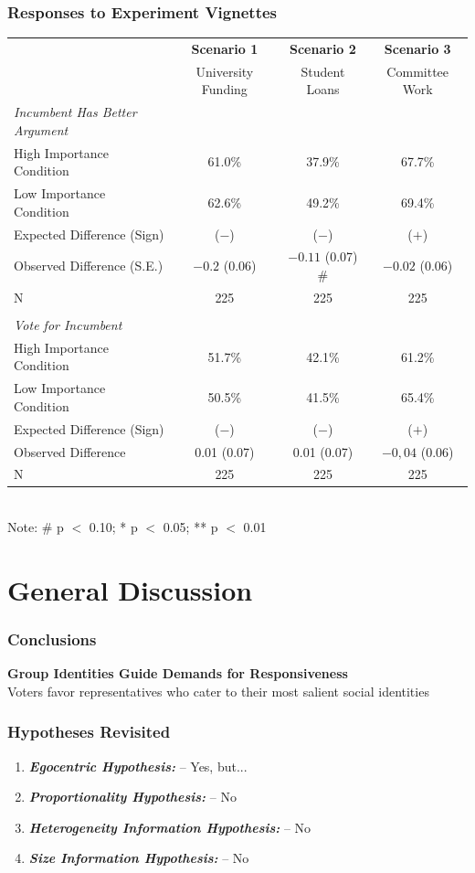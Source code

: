 \documentclass[14pt]{beamer}
\newcommand\e{\emph}
\newcommand\tb{\textbf}
\begin{document}
\begin{frame}
\frametitle{Responses to Experiment Vignettes}
\scriptsize
\begin{table}
	\centering
	\begin{tabulary}{\linewidth}{Lccc}
	\\
	\hline
	&\tb{Scenario 1}&\tb{Scenario 2}&\tb{Scenario 3}\\
	&University Funding& Student Loans&Committee Work\\
	\hline
	\e{Incumbent Has Better Argument}&&&\\
	High Importance Condition&61.0\%&37.9\%&67.7\% \\
	Low Importance Condition&62.6\%&49.2\%&69.4\%\\
	Expected Difference (Sign)& ($-$)&($-$)&($+$)\\
	Observed Difference (S.E.)&$-0.2$ (0.06)&$-0.11$ (0.07) \# &$-0.02$ (0.06)\\
	N&225&225&225\\
	&&&\\
	\e{Vote for Incumbent}&&&\\
	High Importance Condition&51.7\%&42.1\%&61.2\%\\
	Low Importance Condition&50.5\%&41.5\%&65.4\%\\
	Expected Difference (Sign)& ($-$)&($-$)&($+$)\\
	Observed Difference&0.01 (0.07)&0.01 (0.07)&$-0,04$ (0.06)\\
	N&225&225&225\\
	\hline
	\end{tabulary}\\
Note: \# p $<$ 0.10; * p $<$ 0.05; ** p $<$ 0.01
\end{table}
\end{frame}

\section{General Discussion}
\begin{frame}
\frametitle{Conclusions}
\begin{center}
	\large
	\tb{Group Identities Guide Demands for Responsiveness} \\
	\smallskip
	\normalsize 
	Voters favor representatives who cater to their most salient social identities
\end{center}
\end{frame}

\begin{frame}
\frametitle{Hypotheses Revisited}
\begin{enumerate}
	\item \tb{\e{Egocentric Hypothesis:}} -- Yes, but...
	\item \tb{\e{Proportionality Hypothesis:}} -- No
	\item \tb{\e{Heterogeneity Information Hypothesis:}} -- No
	\item \tb{\e{Size Information Hypothesis:}} -- No
\end{enumerate}
\end{frame}
\end{document}
